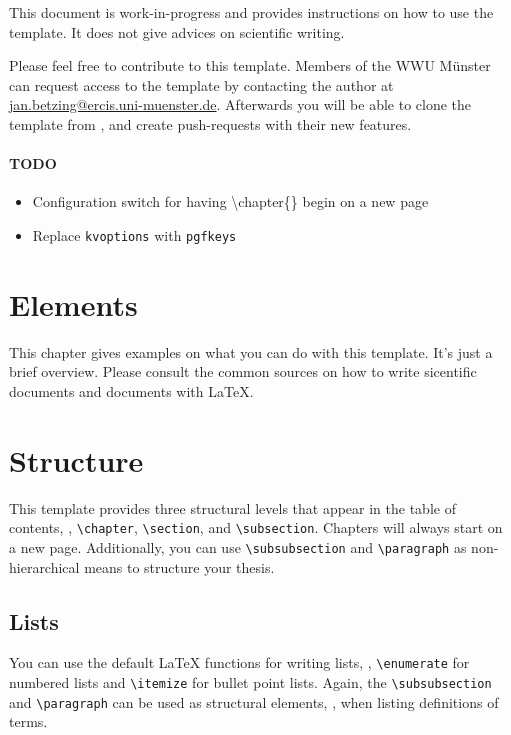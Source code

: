 This document is work-in-progress and provides instructions on how to use the template. It does not give advices on scientific writing.

Please feel free to contribute to this template. Members of the WWU M\"{u}nster can request access to the template by contacting the author at \href{mailto:jan.betzing@ercis.uni-muenster.de}{jan.betzing@ercis.uni-muenster.de}. Afterwards you will be able to clone the template from , and create push-requests with their new features.

\paragraph{TODO}
\begin{itemize}
	\item Configuration switch for having \textbackslash chapter\{\} begin on a new page
	\item Replace \texttt{kvoptions} with \texttt{pgfkeys}
\end{itemize}
\section{Elements}
This chapter gives examples on what you can do with this template. It's just a brief overview. Please consult the common sources on how to write sicentific documents and documents with \LaTeX.

\section{Structure}
This template provides three structural levels that appear in the table of contents, \viz, \texttt{\textbackslash chapter}, \texttt{\textbackslash section}, and \texttt{\textbackslash subsection}. Chapters will always start on a new page. Additionally, you can use \texttt{\textbackslash subsubsection} and \texttt{\textbackslash paragraph} as non-hierarchical means to structure your thesis.


\subsection{Lists}
You can use the default \LaTeX \- functions for writing lists, \viz, \texttt{\textbackslash enumerate} for numbered lists and \texttt{\textbackslash itemize} for bullet point lists. Again, the \texttt{\textbackslash subsubsection} and \texttt{\textbackslash paragraph} can be used as structural elements, \eg, when listing definitions of terms.

